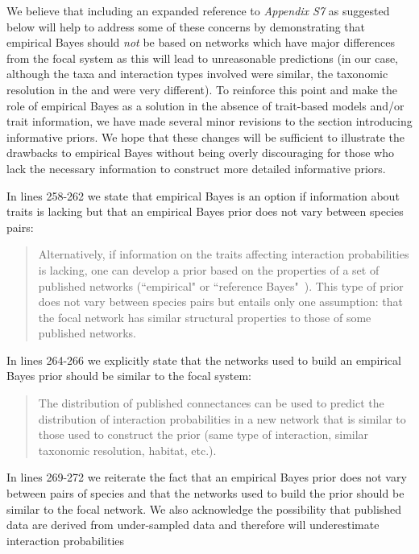 \documentclass[12pt]{letter}
\begin{document}
		We believe that including an expanded reference to \emph{Appendix S7} as suggested below will help to address some of these concerns by demonstrating that empirical Bayes should \emph{not} be based on networks which have major differences from the focal system as this will lead to unreasonable predictions (in our case, although the taxa and interaction types involved were similar, the taxonomic resolution in the \citet{Barbour2016} and \citet{Kopelke2017} were very different). To reinforce this point and make the role of empirical Bayes as a solution in the absence of trait-based models and/or trait information, we have made several minor revisions to the section introducing informative priors. We hope that these changes will be sufficient to illustrate the drawbacks to empirical Bayes without being overly discouraging for those who lack the necessary information to construct more detailed informative priors.


		In lines 258-262 we state that empirical Bayes is an option if information about traits is lacking but that an empirical Bayes prior does not vary between species pairs:


		\begin{quotation}

			Alternatively, if information on the traits affecting interaction probabilities is lacking, one can develop a prior based on the properties of a set of published networks (``empirical" or ``reference Bayes"~\citet{Spiegelhalter2000}). This type of prior does not vary between species pairs but entails only one assumption: that the focal network has similar structural properties to those of some published networks. 

		\end{quotation} 


		In lines 264-266 we explicitly state that the networks used to build an empirical Bayes prior should be similar to the focal system:


		\begin{quotation}

			The distribution of published connectances can be used to predict the distribution of interaction probabilities in a new network that is similar to those used to construct the prior (same type of interaction, similar taxonomic resolution, habitat, etc.).

		\end{quotation}


		In lines 269-272 we reiterate the fact that an empirical Bayes prior does not vary between pairs of species and that the networks used to build the prior should be similar to the focal network. We also acknowledge the possibility that published data are derived from under-sampled data and therefore will underestimate interaction probabilities
\end{document}
